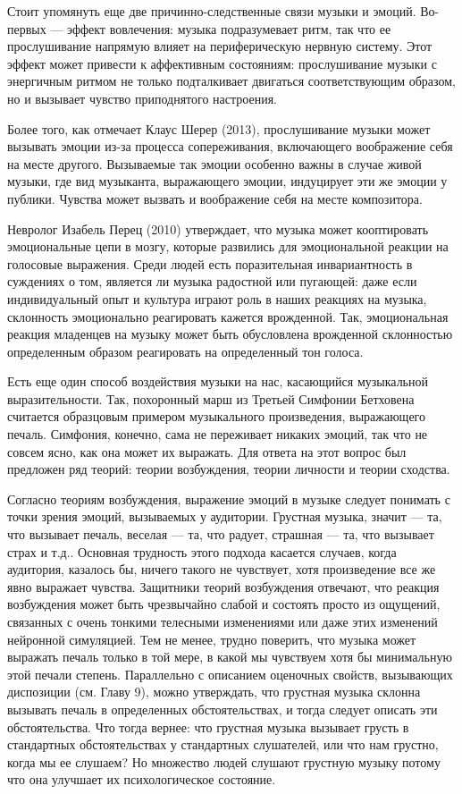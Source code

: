 \documentclass[11pt]{book}
\begin{document}
Стоит упомянуть еще две причинно-следственные связи музыки и эмоций. Во-первых --- эффект вовлечения: музыка подразумевает ритм, так что ее прослушивание напрямую влияет на периферическую нервную систему. Этот эффект может привести к аффективным состояниям: прослушивание музыки с энергичным ритмом не только подталкивает двигаться соответствующим образом, но и вызывает чувство приподнятого настроения.

Более того, как отмечает Клаус Шерер (2013), прослушивание музыки может вызывать эмоции из-за процесса сопереживания, включающего воображение себя на месте другого. Вызываемые так эмоции особенно важны в случае живой музыки, где вид музыканта, выражающего эмоции, индуцирует эти же эмоции у публики. Чувства может вызвать и воображение себя на месте композитора.

Невролог Изабель Перец (2010) утверждает, что музыка может кооптировать эмоциональные цепи в мозгу, которые развились для эмоциональной реакции на голосовые выражения. Среди людей есть поразительная инвариантность в суждениях о том, является ли музыка радостной или пугающей: даже если индивидуальный опыт и культура играют роль в наших реакциях на музыка, склонность эмоционально реагировать кажется врожденной. Так, эмоциональная реакция младенцев на музыку может быть обусловлена врожденной склонностью определенным образом реагировать на определенный тон голоса.

Есть еще один способ воздействия музыки на нас, касающийся музыкальной выразительности. Так, похоронный марш из Третьей Симфонии Бетховена считается образцовым примером музыкального произведения, выражающего печаль. Симфония, конечно, сама не переживает никаких эмоций, так что не совсем ясно, как она может их выражать. Для ответа на этот вопрос был предложен ряд теорий: теории возбуждения, теории личности и теории сходства.

Согласно теориям возбуждения, выражение эмоций в музыке следует понимать с точки зрения эмоций, вызываемых у аудитории. Грустная музыка, значит --- та, что вызывает печаль, веселая --- та, что радует, страшная --- та, что вызывает страх и т.д.. Основная трудность этого подхода касается случаев, когда аудитория, казалось бы, ничего такого не чувствует, хотя произведение все же явно выражает чувства. Защитники теорий возбуждения отвечают, что реакция возбуждения может быть чрезвычайно слабой и состоять просто из ощущений, связанных с очень тонкими телесными изменениями или даже этих изменений нейронной симуляцией. Тем не менее, трудно поверить, что музыка может выражать печаль только в той мере, в какой мы чувствуем хотя бы минимальную этой печали степень. Параллельно с описанием оценочных свойств, вызывающих диспозиции (см. Главу 9), можно утверждать, что грустная музыка склонна вызывать печаль в определенных обстоятельствах, и тогда следует описать эти обстоятельства. Что тогда вернее: что грустная музыка вызывает грусть в стандартных обстоятельствах у стандартных слушателей, или что нам грустно, когда мы ее слушаем? Но множество людей слушают грустную музыку потому что она улучшает их психологическое состояние.
\end{document}
